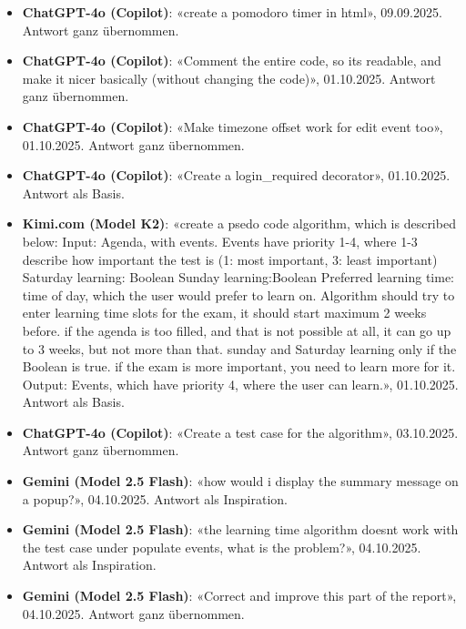 \documentclass[12pt, a4paper]{article}
\begin{document}
\begin{itemize}
    \item \textbf{ChatGPT-4o (Copilot)}: «create a pomodoro timer in html», 09.09.2025. Antwort ganz übernommen.
    
    \item \textbf{ChatGPT-4o (Copilot)}: «Comment the entire code, so its readable, and make it nicer basically (without changing the code)», 01.10.2025. Antwort ganz übernommen.
    
    \item \textbf{ChatGPT-4o (Copilot)}: «Make timezone offset work for edit event too», 01.10.2025. Antwort ganz übernommen.
    
    \item \textbf{ChatGPT-4o (Copilot)}: «Create a login\_required decorator», 01.10.2025. Antwort als Basis.
    
    \item \textbf{Kimi.com (Model K2)}: «create a psedo code algorithm, which is described below: Input: Agenda, with events. Events have priority 1-4, where 1-3 describe how important the test is (1: most important, 3: least important) Saturday learning: Boolean Sunday learning:Boolean Preferred learning time: time of day, which the user would prefer to learn on. Algorithm should try to enter learning time slots for the exam, it should start maximum 2 weeks before. if the agenda is too filled, and that is not possible at all, it can go up to 3 weeks, but not more than that. sunday and Saturday learning only if the Boolean is true. if the exam is more important, you need to learn more for it. Output: Events, which have priority 4, where the user can learn.», 01.10.2025. Antwort als Basis.
    
    \item \textbf{ChatGPT-4o (Copilot)}: «Create a test case for the algorithm», 03.10.2025. Antwort ganz übernommen.
    
    \item \textbf{Gemini (Model 2.5 Flash)}: «how would i display the summary message on a popup?», 04.10.2025. Antwort als Inspiration.
    
    \item \textbf{Gemini (Model 2.5 Flash)}: «the learning time algorithm doesnt work with the test case under populate events, what is the problem?», 04.10.2025. Antwort als Inspiration.
    
    \item \textbf{Gemini (Model 2.5 Flash)}: «Correct and improve this part of the report», 04.10.2025. Antwort ganz übernommen.
    

\end{itemize}
\end{document}
